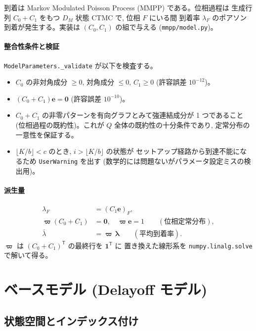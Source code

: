 \documentclass[a4paper,11pt]{article}
\newcommand{\code}[1]{\texttt{#1}}
\begin{document}
到着は Markov Modulated Poisson Process (MMPP) である。位相過程は
生成行列 $C_0+C_1$ をもつ $D_M$ 状態 CTMC で, 位相 $F$ にいる間
到着率 $\lambda_F$ のポアソン到着が発生する。実装は $(C_0,C_1)$ の組で与える
(\code{mmpp/model.py})。

\paragraph{整合性条件と検証}
\code{ModelParameters.\_validate} が以下を検査する。
\begin{itemize}
  \item $C_0$ の非対角成分 $\ge 0$, 対角成分 $\le 0$, $C_1 \ge 0$ (許容誤差 $10^{-12}$)。
  \item $(C_0+C_1)\mathbf{e}=\mathbf{0}$ (許容誤差 $10^{-10}$)。
  \item $C_0+C_1$ の非零パターンを有向グラフとみて強連結成分が 1 つであること
        (位相過程の既約性)。これが $Q$ 全体の既約性の十分条件であり,
        定常分布の一意性を保証する。
  \item $\lfloor K/b\rfloor < c$ のとき, $i>\lfloor K/b\rfloor$ の状態が
        セットアップ経路から到達不能になるため \code{UserWarning} を出す
        (数学的には問題ないがパラメータ設定ミスの検出用)。
\end{itemize}

\paragraph{派生量}
\begin{align}
  \lambda_F &= (C_1\mathbf{e})_F, \\
  \boldsymbol{\varpi}(C_0+C_1) &= \mathbf{0},\quad \boldsymbol{\varpi}\mathbf{e}=1
  \qquad (\text{位相定常分布}), \\
  \bar{\lambda} &= \boldsymbol{\varpi}\,\boldsymbol{\lambda}
  \qquad (\text{平均到着率}).
\end{align}
$\boldsymbol{\varpi}$ は $(C_0+C_1)^{\mathsf T}$ の最終行を $\mathbf{1}^{\mathsf T}$ に
置き換えた線形系を \code{numpy.linalg.solve} で解いて得る。

\section{ベースモデル (Delayoff モデル)}
\label{sec:base}

\subsection{状態空間とインデックス付け}
\end{document}
